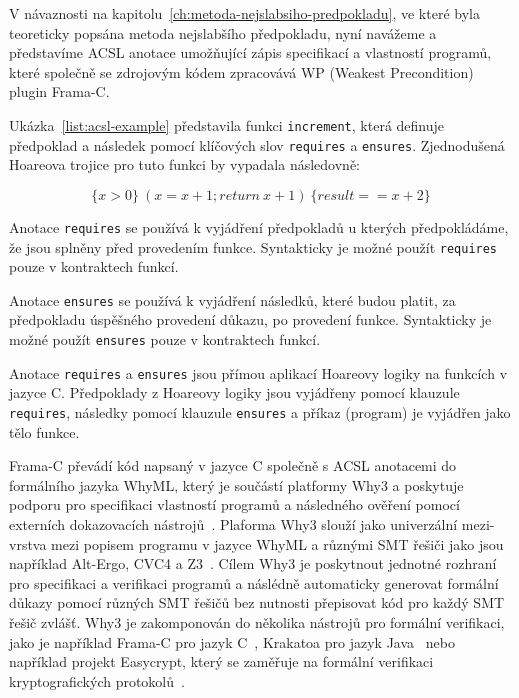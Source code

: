 V návaznosti na kapitolu~\ref{ch:metoda-nejslabsiho-predpokladu},
ve které byla teoreticky popsána metoda nejslabšího předpokladu,
nyní navážeme a představíme ACSL anotace umožňující zápis specifikací a vlastností programů,
které společně se zdrojovým kódem zpracovává WP (Weakest Precondition) plugin Frama\mbox{-}C\@.

Ukázka~\ref{list:acsl-example} představila funkci \texttt{increment},
která definuje předpoklad a následek pomocí klíčových slov \texttt{requires} a \texttt{ensures}.
Zjednodušená Hoareova trojice pro tuto funkci by vypadala následovně:

\begin{equation*}
    \{ x > 0 \} \ (x = x + 1; return \  x + 1) \ \{ result == x + 2 \}
\end{equation*}

Anotace \texttt{requires} se používá k vyjádření předpokladů
u kterých předpokládáme, že jsou splněny před provedením funkce.
Syntakticky je možné použít \texttt{requires} pouze v kontraktech funkcí.

Anotace \texttt{ensures} se používá k vyjádření následků,
které budou platit, za předpokladu úspěšného provedení důkazu, po provedení funkce.
Syntakticky je možné použít \texttt{ensures} pouze v kontraktech funkcí.

Anotace \texttt{requires} a \texttt{ensures}
jsou přímou aplikací Hoareovy logiky na funkcích v jazyce C\@.
Předpoklady z Hoareovy logiky jsou vyjádřeny pomocí klauzule \texttt{requires},
následky pomocí klauzule \texttt{ensures} a příkaz (program) je vyjádřen jako tělo funkce.

Frama\mbox{-}C převádí kód napsaný v jazyce C společně s ACSL anotacemi do formálního jazyka WhyML,
který je součástí platformy Why3 a poskytuje podporu pro specifikaci vlastností programů
a následného ověření pomocí externích dokazovacích nástrojů~\cite{why3web}.
Plaforma Why3 slouží jako univerzální mezi-vrstva mezi popisem programu v jazyce WhyML a různými SMT řešiči
jako jsou například Alt-Ergo, CVC4 a Z3~\cite{boogie11why3}.
Cílem Why3 je poskytnout jednotné rozhraní pro specifikaci a verifikaci programů
a náslédně automaticky generovat formální důkazy pomocí různých SMT řešičů bez nutnosti přepisovat kód pro každý SMT řešič zvlášť.
Why3 je zakomponován do několika nástrojů pro formální verifikaci,
jako je například Frama\mbox{-}C pro jazyk C~\cite{BlanchardACSL2024},
Krakatoa pro jazyk Java~\cite{KrakatoaWhy} nebo například projekt Easycrypt,
který se zaměřuje na formální verifikaci kryptografických protokolů~\cite{why3web}.

